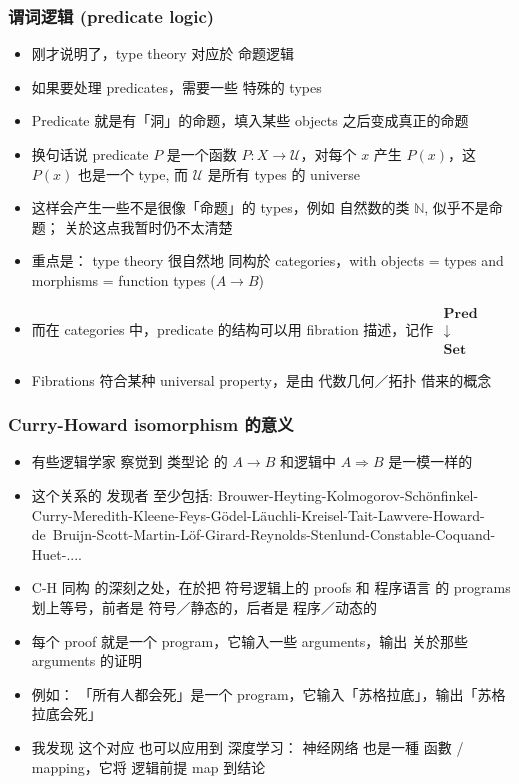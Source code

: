 \documentclass[16pt]{beamer}
\newcommand{\emp}[1]{{\color{violet}#1}}
\begin{document}
\begin{frame}
\frametitle{谓词逻辑 (predicate logic)}
\begin{itemize}
	\item 刚才说明了，type theory 对应於 \emp{命题逻辑}
	
	\item 如果要处理 predicates，需要一些 特殊的 types
	
	\item Predicate 就是有「洞」的命题，填入某些 objects 之后变成真正的命题
	
	\item 换句话说 predicate $P$ 是一个函数 $P: X \rightarrow \mathcal{U}$，对每个 $x$ 产生 $P(x)$，这 $P(x)$ 也是一个 type, 而 $\mathcal{U}$ 是所有 types 的 universe

	\item 这样会产生一些不是很像「命题」的 types，例如 自然数的类 $\mathbb{N}$, 似乎不是命题； 关於这点我暂时仍不太清楚

	\item 重点是： type theory 很自然地 \emp{同构}於 categories，with objects = types and morphisms = function types ($A \rightarrow B$)
	
	\item 而在 categories 中，predicate 的结构可以用 \emp{fibration} 描述，记作
	$\mathrel{\substack{\mathbf{Pred}\\\downarrow\\\mathbf{Set}}}$
	
	\item Fibrations 符合某种 universal property，是由 代数几何／拓扑 借来的概念
\end{itemize}
\end{frame}

\begin{frame}
\frametitle{Curry-Howard isomorphism 的意义}
\begin{itemize}
	\item 有些逻辑学家 察觉到 类型论 的 $A \rightarrow B$ 和逻辑中 $A \Rightarrow B$ 是一模一样的

	\item 这个关系的 发现者 至少包括:  Brouwer-Heyting-Kolmogorov-Sch\"{o}nfinkel-Curry-Meredith-Kleene-Feys-G\"{o}del-L\"{a}uchli-Kreisel-Tait-Lawvere-Howard-\mbox{de Bruijn}-Scott-Martin-L\"{o}f-Girard-Reynolds-Stenlund-Constable-Coquand-Huet-....

	\item C-H 同构 的深刻之处，在於把 符号逻辑上的 proofs 和 程序语言 的 programs 划上等号，前者是 符号／静态的，后者是 程序／动态的

	\item 每个 proof 就是一个 program，它输入一些 arguments，输出 关於那些 arguments 的证明
	
	\item 例如： 「所有人都会死」是一个 program，它输入「苏格拉底」，输出「苏格拉底会死」 
	
	\item 我发现 这个对应 也可以应用到 深度学习： 神经网络 也是一種 函數 / mapping，它将 逻辑前提 map 到结论
\end{itemize}
\end{frame}
\end{document}
